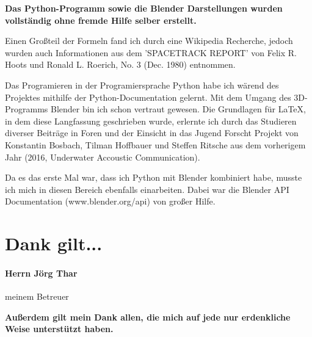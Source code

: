 \begin{center}
 \textbf{
  Das Python-Programm sowie die Blender Darstellungen wurden vollständig ohne fremde Hilfe selber erstellt.
 }
\end{center}
\par Einen Großteil der Formeln fand ich durch eine Wikipedia Recherche, jedoch wurden auch Informationen aus dem 'SPACETRACK REPORT' von Felix R. Hoots und Ronald L. Roerich,
No. 3 (Dec. 1980) entnommen. 
\par Das Programieren in der Programiersprache Python habe ich wärend des Projektes mithilfe der Python-Documentation gelernt. Mit dem Umgang des 3D-Programms Blender
bin ich schon vertraut gewesen. Die Grundlagen für \LaTeX, in dem diese Langfassung geschrieben wurde, erlernte ich durch das Studieren diverser Beiträge in Foren und der Einsicht
in das Jugend Forscht Projekt von Konstantin Bosbach, Tilman Hoffbauer und Steffen Ritsche aus dem vorherigem Jahr (2016, Underwater Accoustic Communication).
\par Da es das erste Mal war, dass ich Python mit Blender kombiniert habe, musste ich mich in diesen Bereich ebenfalls einarbeiten.
Dabei war die Blender API Documentation (www.blender.org/api) von großer Hilfe.


\raggedleft
\section*{Dank gilt...} 
\paragraph{Herrn Jörg Thar} meinem Betreuer

\centering
\vspace{0.5cm} \textbf{Außerdem gilt mein Dank allen, die mich auf jede nur erdenkliche Weise unterstützt haben.}